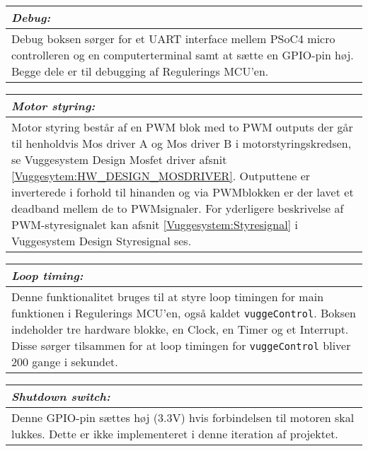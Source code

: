 \begin{center}
    \begin{tabular}{| p{14.5cm} |}
    \hline
    \textit{Debug:} \\ \hline
    Debug boksen sørger for et UART interface mellem PSoC4 micro controlleren og en computerterminal samt at sætte en GPIO-pin høj. Begge dele er til debugging af Regulerings MCU'en. \\ \hline
    \end{tabular}
\end{center}

\begin{center}
    \begin{tabular}{| p{14.5cm} |}
    \hline
    \textit{Motor styring:} \\ \hline
    Motor styring består af en PWM blok med to PWM outputs der går til henholdvis Mos driver A og Mos driver B i motorstyringskredsen, se Vuggesystem Design Mosfet driver afsnit \vref{Vuggesytem:HW_DESIGN_MOSDRIVER}. Outputtene er inverterede i forhold til hinanden og via PWMblokken er der lavet et deadband mellem de to PWMsignaler. For yderligere beskrivelse af PWM-styresignalet kan afsnit \vref{Vuggesystem:Styresignal} i Vuggesystem Design Styresignal ses. \\ \hline
    \end{tabular}
\end{center}


\begin{center}
    \begin{tabular}{| p{14.5cm} |}
    \hline
    \label{vuggesystem: impl,Loop timing} \textit{Loop timing:} \\ \hline
    Denne funktionalitet bruges til at styre loop timingen for main funktionen i Regulerings MCU'en, også kaldet \verb+vuggeControl+. Boksen indeholder tre hardware blokke, en Clock, en Timer og et Interrupt. Disse sørger tilsammen for at loop timingen for \verb+vuggeControl+ bliver 200 gange i sekundet. \\   \hline
    \end{tabular}
\end{center}

\begin{center}
    \begin{tabular}{| p{14.5cm} |}
    \hline
    \textit{Shutdown switch:} \\ \hline
    Denne GPIO-pin sættes høj (3.3V) hvis forbindelsen til motoren skal lukkes. Dette er ikke implementeret i denne iteration af projektet.  \\ \hline
    \end{tabular}
\end{center}

